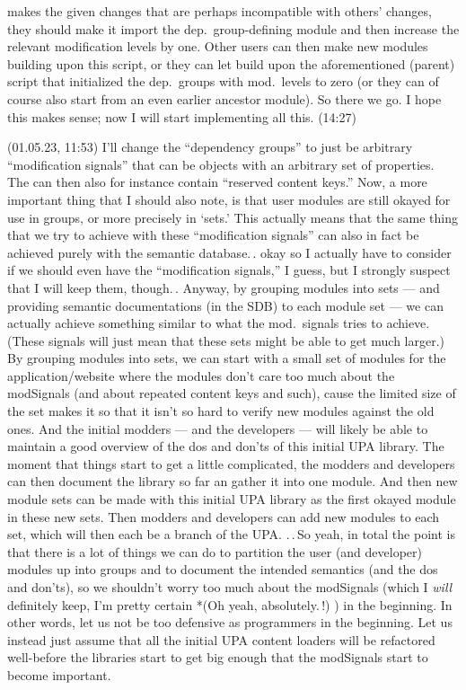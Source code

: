 \documentclass{report}
\begin{document}
makes the given changes that are perhaps incompatible with others' changes, they should make it import the dep.\ group-defining module and then increase the relevant modification levels by one. Other users can then make new modules building upon this script, or they can let build upon the aforementioned (parent) script that initialized the dep.\ groups with mod.\ levels to zero (or they can of course also start from an even earlier ancestor module). So there we go. I hope this makes sense; now I will start implementing all this. (14:27) %

(01.05.23, 11:53) I'll change the ``dependency groups'' to just be arbitrary ``modification signals'' that can be objects with an arbitrary set of properties. The can then also for instance contain ``reserved content keys.'' Now, a more important thing that I should also note, is that user modules are still okayed for use in groups, or more precisely in `sets.' This actually means that the same thing that we try to achieve with these ``modification signals'' can also in fact be achieved purely with the semantic database.\,. okay so I actually have to consider if we should even have the ``modification signals,'' I guess, but I strongly suspect that I will keep them, though.\,. Anyway, by grouping modules into sets --- and providing semantic documentations (in the SDB) to each module set --- we can actually achieve something similar to what the mod.\ signals tries to achieve. (These signals will just mean that these sets might be able to get much larger.) By grouping modules into sets, we can start with a small set of modules for the application/website where the modules don't care too much about the modSignals (and about repeated content keys and such), cause the limited size of the set makes it so that it isn't so hard to verify new modules against the old ones. And the initial modders --- and the developers --- will likely be able to maintain a good overview of the dos and don'ts of this initial UPA library. The moment that things start to get a little complicated, the modders and developers can then document the library so far an gather it into one module. And then new module sets can be made with this initial UPA library as the first okayed module in these new sets. Then modders and developers can add new modules to each set, which will then each be a branch of the UPA. .\,.\,So yeah, in total the point is that there is a lot of things we can do to partition the user (and developer) modules up into groups and to document the intended semantics (and the dos and don'ts), so we shouldn't worry too much about the modSignals (which I \emph{will} definitely keep, I'm pretty certain %
*(Oh yeah, absolutely.\,!)%
) in the beginning. In other words, let us not be too defensive as programmers in the beginning. Let us instead just assume that all the initial UPA content loaders will be refactored well-before the libraries start to get big enough that the modSignals start to become important.
\end{document}
